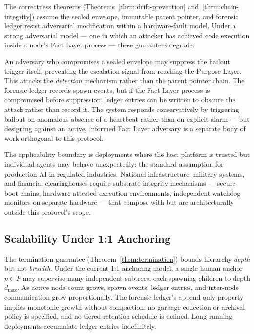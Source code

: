 The correctness theorems (Theorems~\ref{thrm:drift-prevention} and~\ref{thrm:chain-integrity}) assume the sealed envelope, immutable parent pointer, and forensic ledger resist adversarial modification within a hardware-fault model. Under a strong adversarial model — one in which an attacker has achieved code execution inside a node's Fact Layer process — these guarantees degrade.

An adversary who compromises a sealed envelope may suppress the bailout trigger itself, preventing the escalation signal from reaching the Purpose Layer. This attacks the \emph{detection} mechanism rather than the parent pointer chain. The forensic ledger records spawn events, but if the Fact Layer process is compromised before suppression, ledger entries can be written to obscure the attack rather than record it. The system responds conservatively by triggering bailout on anomalous absence of a heartbeat rather than on explicit alarm — but designing against an active, informed Fact Layer adversary is a separate body of work orthogonal to this protocol.

The applicability boundary is deployments where the host platform is trusted but individual agents may behave unexpectedly: the standard assumption for production AI in regulated industries. National infrastructure, military systems, and financial clearinghouses require substrate-integrity mechanisms — secure boot chains, hardware-attested execution environments, independent watchdog monitors on separate hardware — that compose with but are architecturally outside this protocol's scope.

\subsection{Scalability Under 1:1 Anchoring}
\label{sec:limitations-scalability}

The termination guarantee (Theorem~\ref{thrm:termination}) bounds hierarchy \emph{depth} but not \emph{breadth}. Under the current 1:1 anchoring model, a single human anchor $p \in P$ may supervise many independent subtrees, each spawning children to depth $d_{\max}$. As active node count grows, spawn events, ledger entries, and inter-node communication grow proportionally. The forensic ledger's append-only property implies monotonic growth without compaction: no garbage collection or archival policy is specified, and no tiered retention schedule is defined. Long-running deployments accumulate ledger entries indefinitely.

